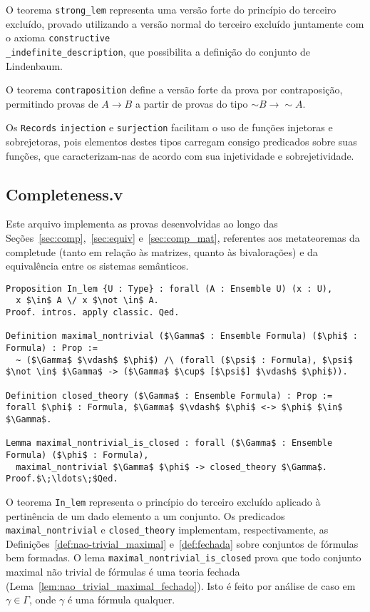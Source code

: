           O teorema \texttt{strong\_lem} representa uma versão forte do princípio do terceiro excluído, provado utilizando a versão normal do terceiro excluído juntamente com o axioma \texttt{constructive\\\_indefinite\_description}, que possibilita a definição do conjunto de Lindenbaum.
          
          O teorema \texttt{contraposition} define a versão forte da prova por contraposição, permitindo provas de $A \to B$ a partir de provas do tipo $\sim B \to \sim A$.
          
          Os \texttt{Records} \texttt{injection} e \texttt{surjection} facilitam o uso de funções injetoras e sobrejetoras, pois elementos destes tipos carregam consigo predicados sobre suas funções, que caracterizam-nas de acordo com sua injetividade e sobrejetividade.

    
    \subsection{Completeness.v}\label{sec:completeness}
        
        Este arquivo implementa as provas desenvolvidas ao longo das Seções~\ref{sec:comp},~\ref{sec:equiv} e~\ref{sec:comp_mat}, referentes aos metateoremas da completude (tanto em relação às matrizes, quanto às bivalorações) e da equivalência entre os sistemas semânticos.

        \begin{lstlisting}[name=Completeness, frame=single, language=coq]
Proposition In_lem {U : Type} : forall (A : Ensemble U) (x : U),
  x $\in$ A \/ x $\not \in$ A.
Proof. intros. apply classic. Qed.

Definition maximal_nontrivial ($\Gamma$ : Ensemble Formula) ($\phi$ : Formula) : Prop :=
  ~ ($\Gamma$ $\vdash$ $\phi$) /\ (forall ($\psi$ : Formula), $\psi$ $\not \in$ $\Gamma$ -> ($\Gamma$ $\cup$ [$\psi$] $\vdash$ $\phi$)).

Definition closed_theory ($\Gamma$ : Ensemble Formula) : Prop := 
forall $\phi$ : Formula, $\Gamma$ $\vdash$ $\phi$ <-> $\phi$ $\in$ $\Gamma$.

Lemma maximal_nontrivial_is_closed : forall ($\Gamma$ : Ensemble Formula) ($\phi$ : Formula),
  maximal_nontrivial $\Gamma$ $\phi$ -> closed_theory $\Gamma$.
Proof.$\;\ldots\;$Qed.
        \end{lstlisting}

        O teorema \texttt{In\_lem} representa o princípio do terceiro excluído aplicado à pertinência de um dado elemento a um conjunto. Os predicados \texttt{maximal\_nontrivial} e \texttt{closed\_theory} implementam, respectivamente, as Definições~\ref{def:nao-trivial_maximal} e~\ref{def:fechada} sobre conjuntos de fórmulas bem formadas. O lema \texttt{maximal\_nontrivial\_is\_closed} prova que todo conjunto maximal não trivial de fórmulas é uma teoria fechada (Lema~\ref{lem:nao_trivial_maximal_fechado}). Isto é feito por análise de caso em $\gamma \in \Gamma$, onde $\gamma$ é uma fórmula qualquer.

